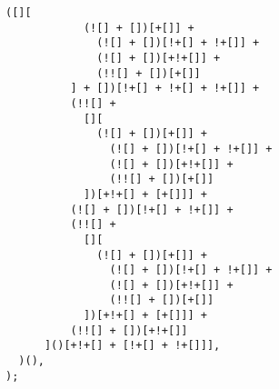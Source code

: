 \begin{lstlisting}[style=basicStyle, caption=alert('XSS') in JSFuck, label={lst:alertxssjsfuck}]
          ([][
            (![] + [])[+[]] +
              (![] + [])[!+[] + !+[]] +
              (![] + [])[+!+[]] +
              (!![] + [])[+[]]
          ] + [])[!+[] + !+[] + !+[]] +
          (!![] +
            [][
              (![] + [])[+[]] +
                (![] + [])[!+[] + !+[]] +
                (![] + [])[+!+[]] +
                (!![] + [])[+[]]
            ])[+!+[] + [+[]]] +
          (![] + [])[!+[] + !+[]] +
          (!![] +
            [][
              (![] + [])[+[]] +
                (![] + [])[!+[] + !+[]] +
                (![] + [])[+!+[]] +
                (!![] + [])[+[]]
            ])[+!+[] + [+[]]] +
          (!![] + [])[+!+[]]
      ]()[+!+[] + [!+[] + !+[]]],
  )(),
);
\end{lstlisting}


